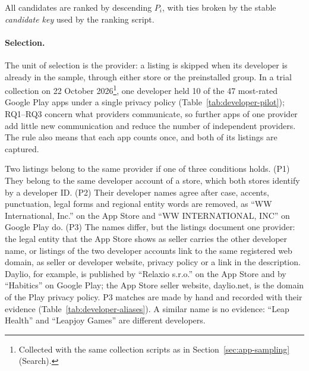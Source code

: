 All candidates are ranked by descending $P_i$, with ties broken by the stable
\emph{candidate key} used by the ranking script.

\paragraph{Selection.} The unit of selection is the provider: a listing is skipped when its developer
is already in the sample, through either store or the preinstalled group. In a
trial collection on 22 October 2026\footnote{Collected with the same collection scripts as in Section~\ref{sec:app-sampling} (Search).}, one developer held 10 of the 47 most-rated
Google Play apps under a single privacy policy (Table~\ref{tab:developer-pilot});
RQ1--RQ3 concern what providers
communicate, so further apps of one provider add little new communication and
reduce the number of independent providers. The rule also means that each app
counts once, and both of its listings are captured.

Two listings belong to the same provider if one of three conditions holds.
(P1) They belong to the same developer account of a store, which both stores
identify by a developer ID\@. (P2) Their developer names agree after case,
accents, punctuation, legal forms and regional entity words are removed, as
\enquote{WW International, Inc.} on the App Store and \enquote{WW
INTERNATIONAL, INC} on Google Play do.
(P3) The names differ, but the listings document one provider: the legal entity
that the App Store shows as seller carries the other developer name, or
listings of the two developer accounts link to the same registered web domain,
as seller or developer website, privacy policy or a link in the description.
Daylio, for example, is published by
\enquote{Relaxio s.r.o.} on the App Store and by \enquote{Habitics} on Google
Play; the App Store seller website, daylio.net, is the domain of the Play
privacy policy. P3 matches are made by hand and recorded with their evidence
(Table~\ref{tab:developer-aliases}). A similar name is no evidence:
\enquote{Leap Health} and \enquote{Leapjoy Games} are different developers.

